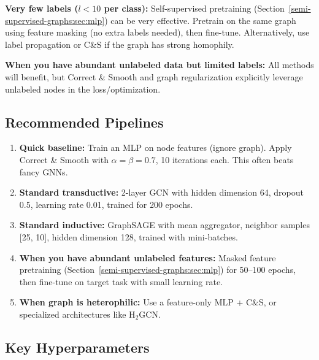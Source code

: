 \begin{notechapter}
\textbf{Very few labels ($l < 10$ per class):}
Self-supervised pretraining (Section~\ref{semi-supervised-graphs:sec:mlp}) can be very effective.
Pretrain on the same graph using feature masking (no extra labels needed),
then fine-tune. Alternatively, use label propagation or C\&S if the graph
has strong homophily.

\textbf{When you have abundant unlabeled data but limited labels:}
All methods will benefit, but Correct \& Smooth and graph regularization
explicitly leverage unlabeled nodes in the loss/optimization.

\subsection{Recommended Pipelines}

\begin{enumerate}
    \item \textbf{Quick baseline:} Train an MLP on node features (ignore graph).
          Apply Correct \& Smooth with $\alpha = \beta = 0.7$, 10 iterations
          each. This often beats fancy GNNs.

    \item \textbf{Standard transductive:} 2-layer GCN with hidden dimension 64,
          dropout 0.5, learning rate 0.01, trained for 200 epochs.

    \item \textbf{Standard inductive:} GraphSAGE with mean aggregator,
          neighbor samples [25, 10], hidden dimension 128, trained with
          mini-batches.

    \item \textbf{When you have abundant unlabeled features:} Masked feature
          pretraining (Section~\ref{semi-supervised-graphs:sec:mlp}) for 50--100 epochs, then
          fine-tune on target task with small learning rate.

    \item \textbf{When graph is heterophilic:} Use a feature-only MLP + C\&S,
          or specialized architectures like H$_2$GCN.
\end{enumerate}

\subsection{Key Hyperparameters}


\end{notechapter}
